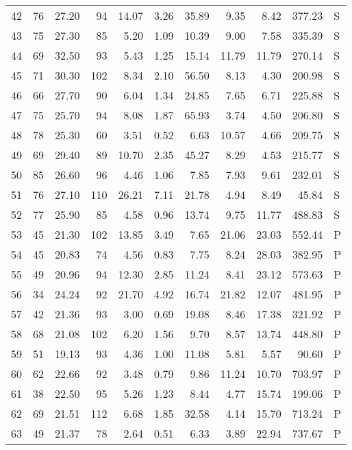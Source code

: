 \begin{table}[ht]
\begin{tabular}{rrrrrrrrrrl}
  42 &  76 & 27.20 &  94 & 14.07 & 3.26 & 35.89 & 9.35 & 8.42 & 377.23 & S \\ 
  43 &  75 & 27.30 &  85 & 5.20 & 1.09 & 10.39 & 9.00 & 7.58 & 335.39 & S \\ 
  44 &  69 & 32.50 &  93 & 5.43 & 1.25 & 15.14 & 11.79 & 11.79 & 270.14 & S \\ 
  45 &  71 & 30.30 & 102 & 8.34 & 2.10 & 56.50 & 8.13 & 4.30 & 200.98 & S \\ 
  46 &  66 & 27.70 &  90 & 6.04 & 1.34 & 24.85 & 7.65 & 6.71 & 225.88 & S \\ 
  47 &  75 & 25.70 &  94 & 8.08 & 1.87 & 65.93 & 3.74 & 4.50 & 206.80 & S \\ 
  48 &  78 & 25.30 &  60 & 3.51 & 0.52 & 6.63 & 10.57 & 4.66 & 209.75 & S \\ 
  49 &  69 & 29.40 &  89 & 10.70 & 2.35 & 45.27 & 8.29 & 4.53 & 215.77 & S \\ 
  50 &  85 & 26.60 &  96 & 4.46 & 1.06 & 7.85 & 7.93 & 9.61 & 232.01 & S \\ 
  51 &  76 & 27.10 & 110 & 26.21 & 7.11 & 21.78 & 4.94 & 8.49 & 45.84 & S \\ 
  52 &  77 & 25.90 &  85 & 4.58 & 0.96 & 13.74 & 9.75 & 11.77 & 488.83 & S \\ 
  53 &  45 & 21.30 & 102 & 13.85 & 3.49 & 7.65 & 21.06 & 23.03 & 552.44 & P \\ 
  54 &  45 & 20.83 &  74 & 4.56 & 0.83 & 7.75 & 8.24 & 28.03 & 382.95 & P \\ 
  55 &  49 & 20.96 &  94 & 12.30 & 2.85 & 11.24 & 8.41 & 23.12 & 573.63 & P \\ 
  56 &  34 & 24.24 &  92 & 21.70 & 4.92 & 16.74 & 21.82 & 12.07 & 481.95 & P \\ 
  57 &  42 & 21.36 &  93 & 3.00 & 0.69 & 19.08 & 8.46 & 17.38 & 321.92 & P \\ 
  58 &  68 & 21.08 & 102 & 6.20 & 1.56 & 9.70 & 8.57 & 13.74 & 448.80 & P \\ 
  59 &  51 & 19.13 &  93 & 4.36 & 1.00 & 11.08 & 5.81 & 5.57 & 90.60 & P \\ 
  60 &  62 & 22.66 &  92 & 3.48 & 0.79 & 9.86 & 11.24 & 10.70 & 703.97 & P \\ 
  61 &  38 & 22.50 &  95 & 5.26 & 1.23 & 8.44 & 4.77 & 15.74 & 199.06 & P \\ 
  62 &  69 & 21.51 & 112 & 6.68 & 1.85 & 32.58 & 4.14 & 15.70 & 713.24 & P \\ 
  63 &  49 & 21.37 &  78 & 2.64 & 0.51 & 6.33 & 3.89 & 22.94 & 737.67 & P \\ 

\end{tabular}
\end{table}
